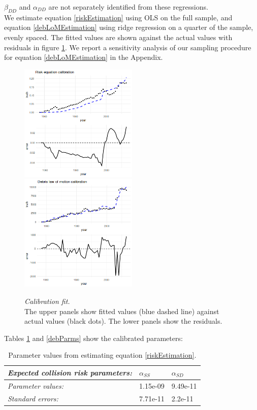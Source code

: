 \documentclass[12pt]{article}
\begin{document}
$\beta_{DD}$ and $\alpha_{DD}$ are not separately identified from these regressions. \\

We estimate equation \ref{riskEstimation} using OLS on the full sample, and equation \ref{debLoMEstimation} using ridge regression on a quarter of the sample, evenly spaced. The fitted values are shown against the actual values with residuals in figure \ref{debCalibration}. We report a sensitivity analysis of our sampling procedure for equation \ref{debLoMEstimation} in the Appendix.

\begin{figure}[H]
	\includegraphics[width=0.5\textwidth]{../../images/risk_fit_plot.png}
	\includegraphics[width=0.5\textwidth]{../../images/debris_lom_fit_plot.png}
	\captionsetup{format=hang}
	\caption{\textit{Calibration fit.} \\
		The upper panels show fitted values (blue dashed line) against actual values (black dots). The lower panels show the residuals.
	}
	\label{debCalibration}
\end{figure}

Tables \ref{riskParms} and \ref{debParms} show the calibrated parameters:

\begin{table}[H]
	\centering
	\begin{tabular}{|l|l|l|}
		\hline
		\textit{Expected collision risk parameters:}      & \textbf{$\alpha_{SS}$} & \textbf{$\alpha_{SD}$} \\ \hline
		\textit{Parameter values:} & 1.15e-09               & 9.49e-11               \\ \hline
		\textit{Standard errors:} & 7.71e-11 & 2.2e-11 \\ \hline
	\end{tabular}
	\caption{Parameter values from estimating equation \ref{riskEstimation}.}
	\label{riskParms}
\end{table}
\end{document}
